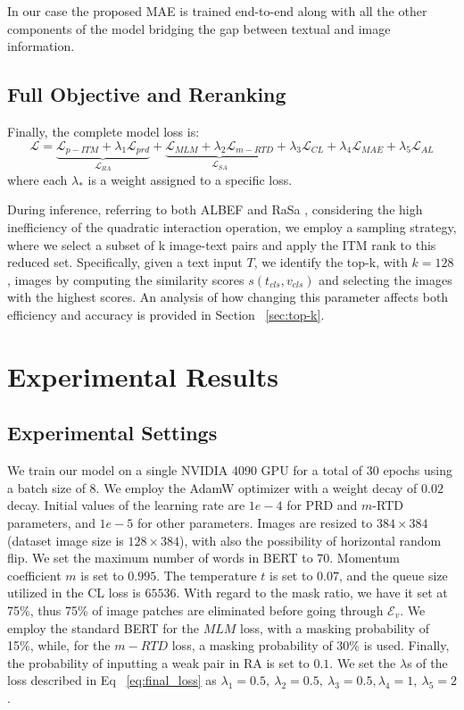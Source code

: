 \documentclass[acmsmall]{acmart}
\begin{document}
In our case the proposed MAE is trained end-to-end along with all the other components of the model bridging the gap between textual and image information.

\subsection{Full Objective and Reranking}
Finally, the complete model loss is:
\begin{equation}
    \mathcal{L}=\underbrace{\mathcal{L}_{p-ITM}+\lambda_1\mathcal{L}_{prd}}_{\mathcal{L}_{RA}}+\underbrace{\mathcal{L}_{MLM}+\lambda_2\mathcal{L}_{m-RTD}}_{\mathcal{L}_{SA}}+\lambda_3\mathcal{L}_{CL}+\lambda_4\mathcal{L}_{MAE}+\lambda_5\mathcal{L}_{AL}
    \label{eq:final_loss}
\end{equation}
\noindent where each $\lambda_*$ is a weight assigned to a specific loss.

During inference, referring to both ALBEF \cite{li2021align} and RaSa \cite{bai2023rasa}, considering the high inefficiency of the quadratic interaction operation, we employ a sampling strategy, where we select a subset of k image-text pairs and apply the ITM rank to this reduced set. Specifically, given a text input $T$, we identify the top-k, with $k=128$, images by computing the similarity scores $s(t_{cls},v_{cls})$ and selecting the images with the highest scores. An analysis of how changing this parameter affects both efficiency and accuracy is provided in Section ~\ref{sec:top-k}.

\section{Experimental Results}

\subsection{Experimental Settings}
We train our model on a single NVIDIA 4090 GPU for a total of 30 epochs using a batch size of 8. We employ the AdamW optimizer \cite{loshchilov2018decoupled} with a weight decay of $0.02$ decay. Initial values of the learning rate are $1e-4$ for PRD and $m$-RTD parameters, and $1e-5$ for other parameters. Images are resized to $384\times 384$ (dataset image size is $128\times 384$), with also the possibility of horizontal random flip. We set the maximum number of words in BERT to 70. Momentum coefficient $m$ is set to $0.995$. The temperature $t$ is set to $0.07$, and the queue size utilized in the CL loss is $65536$. With regard to the mask ratio, we have it set at 75\%, thus 75\% of image patches are eliminated before going through $\mathcal{E}_v$. We employ the standard BERT \cite{devlin2018bert} for the $MLM$ loss, with a masking probability of 15\%, while, for the $m-RTD$ loss, a masking probability of 30\% is used. Finally, the probability of inputting a weak pair in RA is set to $0.1$. We set the $\lambda$s of the loss described in Eq ~\ref{eq:final_loss} as $\lambda_1=0.5,\:\lambda_2=0.5,\:\lambda_3=0.5,\lambda_4=1,\:\lambda_5=2$.
\end{document}
